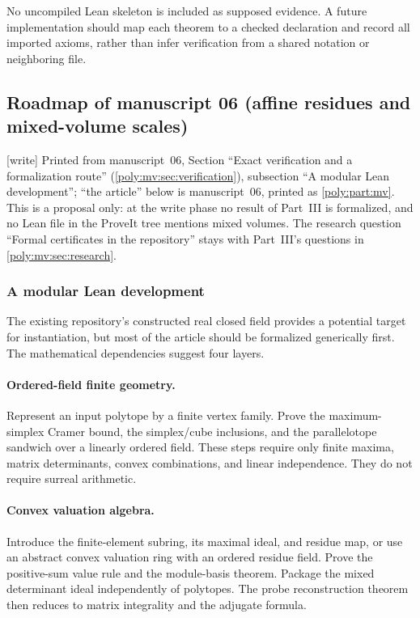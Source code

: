 \documentclass[11pt,a4paper]{article}
\numberwithin{equation}{section}
\theoremstyle{plain}
\newcommand{\wtag}{\textup{[write]}}%
\begin{document}
No uncompiled Lean skeleton is included as supposed evidence. A future
implementation should map each theorem to a checked declaration and
record all imported axioms, rather than infer verification from a shared
notation or neighboring file.

\subsection{Roadmap of manuscript 06 (affine residues and mixed-volume scales)}\label{poly:mv:sec:formalization}
\wtag{} Printed from manuscript~06, Section ``Exact verification and a
formalization route'' (\cref{poly:mv:sec:verification}), subsection ``A
modular Lean development''; ``the article'' below is manuscript~06, printed
as \cref{poly:part:mv}. This is a proposal only: at the write phase no
result of Part~III is formalized, and no Lean file in the ProveIt tree
mentions mixed volumes. The research
question ``Formal certificates in the repository'' stays with Part~III's
questions in \cref{poly:mv:sec:research}.
\subsubsection*{A modular Lean development}
The existing repository's constructed real closed field provides a
potential target for instantiation, but most of the article should be
formalized generically first. The mathematical dependencies suggest four
layers.

\paragraph{Ordered-field finite geometry.}
Represent an input polytope by a finite vertex family. Prove the
maximum-simplex Cramer bound, the simplex/cube inclusions, and the
parallelotope sandwich over a linearly ordered field. These steps require
only finite maxima, matrix determinants, convex combinations, and linear
independence. They do not require surreal arithmetic.

\paragraph{Convex valuation algebra.}
Introduce the finite-element subring, its maximal ideal, and residue
map, or use an abstract convex valuation ring with an ordered residue
field. Prove the positive-sum value rule and the module-basis theorem.
Package the mixed determinant ideal independently of polytopes. The
probe reconstruction theorem then reduces to matrix integrality and the
adjugate formula.
\end{document}
